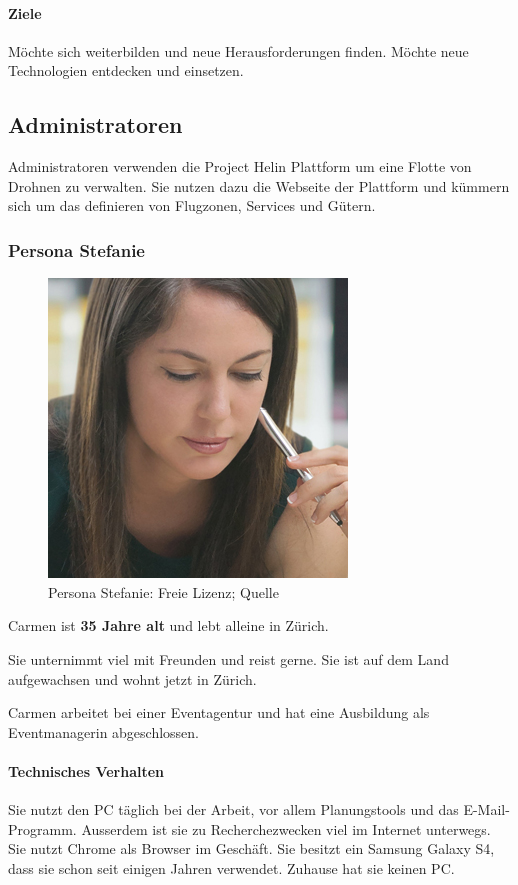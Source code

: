 \paragraph{Ziele}

Möchte sich weiterbilden und neue Herausforderungen finden. Möchte neue Technologien entdecken und einsetzen.\\

\subsection{Administratoren}

Administratoren verwenden die Project Helin Plattform um eine Flotte von Drohnen zu verwalten. Sie nutzen dazu die Webseite der Plattform und kümmern sich um das definieren von Flugzonen, Services und Gütern.

\subsubsection{Persona Stefanie}
\begin{figure}[h]
	\includegraphics[width=.35\textwidth]{images/persona-stefanie.jpg}
	\caption{Persona Stefanie: Freie Lizenz; Quelle} %
	\label{fig:stefanie}
\end{figure}


Carmen ist \textbf{35 Jahre alt} und lebt alleine in Zürich.

Sie unternimmt viel mit Freunden und reist gerne. Sie ist auf dem Land aufgewachsen und wohnt jetzt in Zürich.

Carmen arbeitet bei einer Eventagentur und hat eine Ausbildung als Eventmanagerin abgeschlossen.

\paragraph{Technisches Verhalten}
Sie nutzt den PC täglich bei der Arbeit, vor allem Planungstools und das E-Mail-Programm. Ausserdem ist sie zu Recherchezwecken viel im Internet unterwegs. Sie nutzt Chrome als Browser im Geschäft. Sie besitzt ein Samsung Galaxy S4, dass sie schon seit einigen Jahren verwendet. Zuhause hat sie keinen PC.

